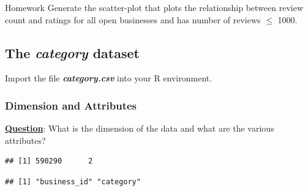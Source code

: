 \begin{DIY}{Homework}
\noindent Generate the scatter-plot that plots the relationship between review count and ratings for all open businesses and has number of reviews $\leq$ 1000.
\end{DIY}

\newpage
\subsection{The \textbf{\emph{category}} dataset}
\noindent Import the file \emph{\textbf{category.csv}} into your R environment.  


\subsubsection{Dimension and Attributes}
\noindent \textbf{\underline{Question}}: What is the dimension of the data and what are the various attributes?
\begin{knitrout}
\color{fgcolor}\begin{kframe}
\begin{alltt}
\end{alltt}
\begin{verbatim}
## [1] 590290      2
\end{verbatim}
\begin{alltt}
\end{alltt}
\begin{verbatim}
## [1] "business_id" "category"
\end{verbatim}
\begin{alltt}
\end{alltt}
\end{kframe}
\end{knitrout}

